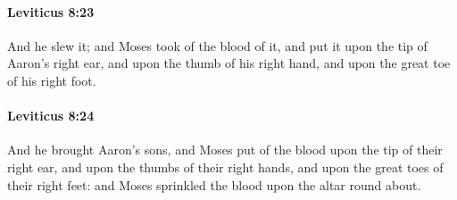 		\paragraph{Leviticus 8:23} %
			\label{LEVITICUS-8-23}

			And he slew it; and Moses took of the blood of it, and put it upon the tip of Aaron’s right ear, and upon the thumb of his right hand, and upon the great toe of his right foot.


		\paragraph{Leviticus 8:24} %
			\label{LEVITICUS-8-24}

			And he brought Aaron’s sons, and Moses put of the blood upon the tip of their right ear, and upon the thumbs of their right hands, and upon the great toes of their right feet: and Moses sprinkled the blood upon the altar round about.

